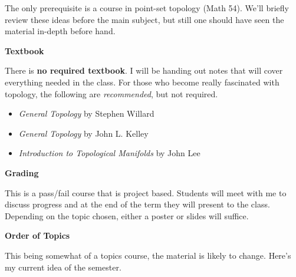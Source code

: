 \documentclass{article}
\begin{document}
    The only prerequisite is a course in point-set topology (Math 54). We’ll
    briefly review these ideas before the main subject, but still one should
    have seen the material in-depth before hand.
    \par\hfill\par
    \textbf{Textbook}
    \par\hfill\par
    There is \textbf{no required textbook}. I will be handing out notes
    that will cover everything needed in the class.
    For those who become really fascinated with topology, the following are
    \textit{recommended}, but not required.
    \begin{itemize}
        \item \textit{General Topology} by Stephen Willard
        \item \textit{General Topology} by John L. Kelley
        \item \textit{Introduction to Topological Manifolds} by John Lee
    \end{itemize}
    \par\hfill\par
    \textbf{Grading}
    \par\hfill\par
    This is a pass/fail course that is project based. Students will meet with
    me to discuss progress and at the end of the term they will present to the
    class. Depending on the topic chosen, either a poster or slides will
    suffice.
    \par\hfill\par
    \textbf{Order of Topics}
    \par\hfill\par
    This being somewhat of a topics course, the material is likely to change.
    Here’s my current idea of the semester.
\end{document}
